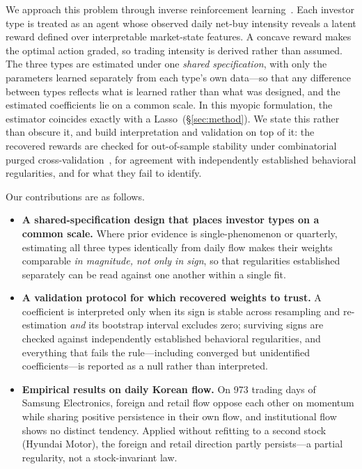 \documentclass[sigconf,anonymous,review]{acmart}
\begin{document}
We approach this problem through inverse reinforcement
learning~\cite{ziebart2008}. Each investor type is treated as an agent
whose observed daily net-buy intensity reveals a latent reward defined
over interpretable market-state features. A concave reward makes the
optimal action graded, so trading intensity is derived rather than
assumed. The three types are estimated under one \emph{shared
specification}, with only the parameters learned separately from each
type's own data---so that any difference between types reflects what is learned
rather than what was designed, and the estimated coefficients lie on a
common scale. In this
myopic formulation, the estimator coincides exactly with a
Lasso~(\S\ref{sec:method}). We state this rather than obscure it, and
build interpretation and validation on top of it: the recovered rewards
are checked for out-of-sample stability under combinatorial purged
cross-validation~\cite{lopezdeprado2018}, for agreement with
independently established behavioral regularities, and for what they
fail to identify.

Our contributions are as follows.

\begin{itemize}
  \item \textbf{A shared-specification design that places investor types
    on a common scale.} Where prior evidence is single-phenomenon or
    quarterly, estimating all three types identically from daily flow
    makes their weights comparable \emph{in magnitude, not only in sign},
    so that regularities established separately can be read against one
    another within a single fit.
  \item \textbf{A validation protocol for which recovered weights to
    trust.} A coefficient is interpreted only when its sign is stable
    across resampling and re-estimation \emph{and} its bootstrap interval
    excludes zero; surviving signs are checked against independently
    established behavioral regularities, and everything that fails the
    rule---including converged but unidentified coefficients---is reported
    as a null rather than interpreted.
  \item \textbf{Empirical results on daily Korean flow.} On 973 trading
    days of Samsung Electronics, foreign and retail flow oppose each other
    on momentum while sharing positive persistence in their own flow, and
    institutional flow shows no distinct tendency. Applied without
    refitting to a second stock (Hyundai Motor), the foreign and retail
    direction partly persists---a partial regularity, not a
    stock-invariant law.
\end{itemize}
\end{document}
